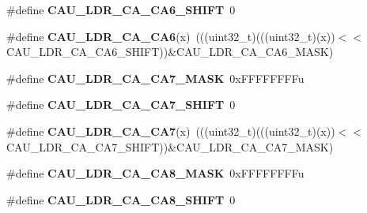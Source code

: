 \begin{DoxyCompactItemize}
\item 
\#define {\bfseries C\+A\+U\+\_\+\+L\+D\+R\+\_\+\+C\+A\+\_\+\+C\+A6\+\_\+\+S\+H\+I\+FT}~0\hypertarget{group__CAU__Register__Masks_gae0d78056f6ad5c5565d3f767b72335cb}{}\label{group__CAU__Register__Masks_gae0d78056f6ad5c5565d3f767b72335cb}

\item 
\#define {\bfseries C\+A\+U\+\_\+\+L\+D\+R\+\_\+\+C\+A\+\_\+\+C\+A6}(x)~(((uint32\+\_\+t)(((uint32\+\_\+t)(x))$<$$<$C\+A\+U\+\_\+\+L\+D\+R\+\_\+\+C\+A\+\_\+\+C\+A6\+\_\+\+S\+H\+I\+FT))\&C\+A\+U\+\_\+\+L\+D\+R\+\_\+\+C\+A\+\_\+\+C\+A6\+\_\+\+M\+A\+SK)\hypertarget{group__CAU__Register__Masks_ga3441da8acbdcfca4ba70891206ba3091}{}\label{group__CAU__Register__Masks_ga3441da8acbdcfca4ba70891206ba3091}

\item 
\#define {\bfseries C\+A\+U\+\_\+\+L\+D\+R\+\_\+\+C\+A\+\_\+\+C\+A7\+\_\+\+M\+A\+SK}~0x\+F\+F\+F\+F\+F\+F\+F\+Fu\hypertarget{group__CAU__Register__Masks_ga0aa892e32b2be9b3958706939c94ef3b}{}\label{group__CAU__Register__Masks_ga0aa892e32b2be9b3958706939c94ef3b}

\item 
\#define {\bfseries C\+A\+U\+\_\+\+L\+D\+R\+\_\+\+C\+A\+\_\+\+C\+A7\+\_\+\+S\+H\+I\+FT}~0\hypertarget{group__CAU__Register__Masks_ga8630e23e305784aed9a981844b18f468}{}\label{group__CAU__Register__Masks_ga8630e23e305784aed9a981844b18f468}

\item 
\#define {\bfseries C\+A\+U\+\_\+\+L\+D\+R\+\_\+\+C\+A\+\_\+\+C\+A7}(x)~(((uint32\+\_\+t)(((uint32\+\_\+t)(x))$<$$<$C\+A\+U\+\_\+\+L\+D\+R\+\_\+\+C\+A\+\_\+\+C\+A7\+\_\+\+S\+H\+I\+FT))\&C\+A\+U\+\_\+\+L\+D\+R\+\_\+\+C\+A\+\_\+\+C\+A7\+\_\+\+M\+A\+SK)\hypertarget{group__CAU__Register__Masks_gad7bbc0cca5ec64cec77f9b0602024cda}{}\label{group__CAU__Register__Masks_gad7bbc0cca5ec64cec77f9b0602024cda}

\item 
\#define {\bfseries C\+A\+U\+\_\+\+L\+D\+R\+\_\+\+C\+A\+\_\+\+C\+A8\+\_\+\+M\+A\+SK}~0x\+F\+F\+F\+F\+F\+F\+F\+Fu\hypertarget{group__CAU__Register__Masks_ga85639a056055e9b13bd051f13fa061f8}{}\label{group__CAU__Register__Masks_ga85639a056055e9b13bd051f13fa061f8}

\item 
\#define {\bfseries C\+A\+U\+\_\+\+L\+D\+R\+\_\+\+C\+A\+\_\+\+C\+A8\+\_\+\+S\+H\+I\+FT}~0\hypertarget{group__CAU__Register__Masks_ga41f527c7bdb6b4b5502baa4d4dc79cbc}{}\label{group__CAU__Register__Masks_ga41f527c7bdb6b4b5502baa4d4dc79cbc}


\end{DoxyCompactItemize}

